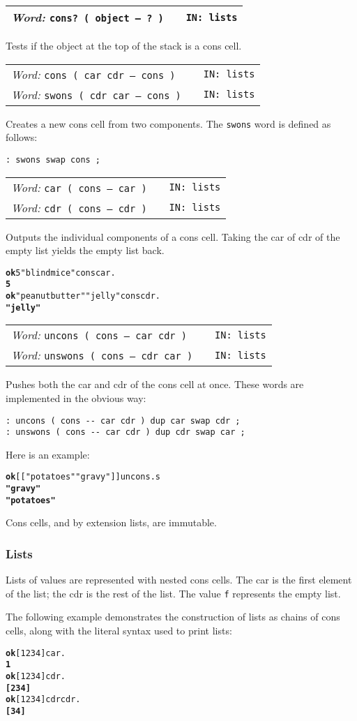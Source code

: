 \documentclass{report}
\newcommand{\ordinaryword}[3]{\index{#1}
\emph{Word:} \texttt{#2} &&\texttt{IN: #3}}
\newcommand{\wordtable}[1]{

\begin{tabularx}{12cm}[t]{lXr}
\hline
#1\\
\hline
\end{tabularx}

}
\begin{document}
\wordtable{
\ordinaryword{cons?}{cons?~( object -- ?~)}{lists}
}
Tests if the object at the top of the stack is a cons cell.
\wordtable{
\ordinaryword{cons}{cons ( car cdr -- cons )}{lists}\\
\ordinaryword{swons}{swons ( cdr car -- cons )}{lists}
}
Creates a new cons cell from two components. The \texttt{swons} word is defined as follows:
\begin{verbatim}
: swons swap cons ;
\end{verbatim}
\wordtable{
\ordinaryword{car}{car ( cons -- car )}{lists}\\
\ordinaryword{cdr}{cdr ( cons -- cdr )}{lists}
}
Outputs the individual components of a cons cell. Taking the car of cdr of the empty list yields the empty list back.
\begin{alltt}
\textbf{ok} 5 "blind mice" cons car .
\textbf{5}
\textbf{ok} "peanut butter" "jelly" cons cdr .
\textbf{"jelly"}
\end{alltt}
\wordtable{
\ordinaryword{uncons}{uncons ( cons -- car cdr )}{lists}\\
\ordinaryword{unswons}{unswons ( cons -- cdr car )}{lists}
}
Pushes both the car and cdr of the cons cell at once. These words are implemented in the obvious way:
\begin{verbatim}
: uncons ( cons -- car cdr ) dup car swap cdr ;
: unswons ( cons -- car cdr ) dup cdr swap car ;
\end{verbatim}
Here is an example:
\begin{alltt}
\textbf{ok} {[[} "potatoes" "gravy" {]]} uncons .s
\textbf{"gravy"
"potatoes"}
\end{alltt}
Cons cells, and by extension lists, are immutable.

\subsubsection{Lists}

\listglos
{}

Lists of values are represented with nested cons cells. The car is the first element of the list; the cdr is the rest of the list. The value \texttt{f} represents the empty list.

The following example demonstrates the construction of lists as chains of cons cells, along with the literal syntax used to print lists:
\begin{alltt}
\textbf{ok} {[} 1 2 3 4 {]} car .
\textbf{1}
\textbf{ok} {[} 1 2 3 4 {]} cdr .
\textbf{{[} 2 3 4 {]}}
\textbf{ok} {[} 1 2 3 4 {]} cdr cdr .
\textbf{{[} 3 4 {]}}
\end{alltt}
\end{document}
